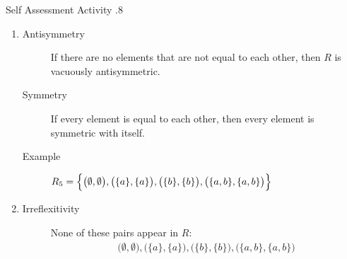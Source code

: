 \documentclass[../notes.tex]{subfiles}
\begin{document}
\begin{exercise}{Self Assessment Activity \thechapter.8}
\begin{enumerate}
\begin{enumerate}[label=(\alph*)]
								\item {}
									\begin{description}
										\item[Antisymmetry] If there are no elements that are not equal to each other, then $R$ is vacuously antisymmetric.
										\item[Symmetry] If every element is equal to each other, then every element is symmetric with itself.
										\item[Example] $
											\begin{aligned}[t]
												R_{5} &= \Bigl\{\bigl(\emptyset, \emptyset\bigr), \bigl(\{a\}, \{a\}\bigr), \bigl(\{b\}, \{b\}\bigr), \bigl(\{a, b\}, \{a, b\}\bigr)\Bigr\}
											\end{aligned}  $
									\end{description}
								\item {}
									\begin{description}
										\item[Irreflexitivity] None of these pairs appear in $R$:
											\begin{align*}
												\bigl(\emptyset, \emptyset\bigr), \bigl(\{a\}, \{a\}\bigr), \bigl(\{b\}, \{b\}\bigr), \bigl(\{a, b\}, \{a, b\}\bigr)

\end{align*}
\end{description}
\end{enumerate}
\end{enumerate}
\end{exercise}
\end{document}
